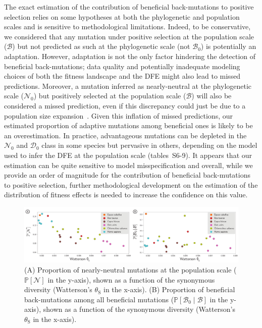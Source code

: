 \documentclass[12pt]{article}
\newcommand{\proba}{\mathbb{P}}
\newcommand{\SphyDel}{\mathcal{D}_0}
\newcommand{\SphyNeu}{\mathcal{N}_0}
\newcommand{\SphyBen}{\mathcal{B}_0}
\newcommand{\given}{\mid}
\newcommand{\SpopNeu}{\mathcal{N}}
\newcommand{\SpopBen}{\mathcal{B}}
\newcommand{\thetaSyn}{\theta_{\text{S}}}
\begin{document}
The exact estimation of the contribution of beneficial back-mutations to positive selection relies on some hypotheses at both the phylogenetic and population scales and is sensitive to methodological limitations.
Indeed, to be conservative, we considered that any mutation under positive selection at the population scale ($\SpopBen$) but not predicted as such at the phylogenetic scale (not $\SphyBen$) is potentially an adaptation.
However, adaptation is not the only factor hindering the detection of beneficial back-mutations; data quality and potentially inadequate modeling choices of both the fitness landscape and the DFE might also lead to missed predictions.
Moreover, a mutation inferred as nearly-neutral at the phylogenetic scale ($\SphyNeu$) but positively selected at the population scale ($\SpopBen$) will also be considered a missed prediction, even if this discrepancy could just be due to a population size expansion~\cite{lanfear_population_2014, jones_shifting_2017, platt_protein_2018}.
Given this inflation of missed predictions, our estimated proportion of adaptive mutations among beneficial ones is likely to be an overestimation.
In practice, advantageous mutations can be depleted in the $\SphyNeu$ and $\SphyDel$ class in some species but pervasive in others, depending on the model used to infer the DFE at the population scale (tables~S6-9).
It appears that our estimation can be quite sensitive to model misspecification and overall, while we provide an order of magnitude for the contribution of beneficial back-mutations to positive selection, further methodological development on the estimation of the distribution of fitness effects is needed to increase the confidence on this value.


\begin{figure}[!ht]
    \centering
    \includegraphics[width=\textwidth, page=1] {artworks/figure.diversity}
    \caption{
        (A) Proportion of nearly-neutral mutations at the population scale ($\proba [ \SpopNeu]$ in the y-axis), shown as a function of the synonymous diversity (Watterson's $\thetaSyn$ in the x-axis).
        (B) Proportion of beneficial back-mutations among all beneficial mutations ($\proba [ \SphyBen  \given  \SpopBen]$ in the y-axis), shown as a function of the synonymous diversity (Watterson's $\thetaSyn$ in the x-axis).
    }
    \label{fig:diversity}
\end{figure}
\end{document}
